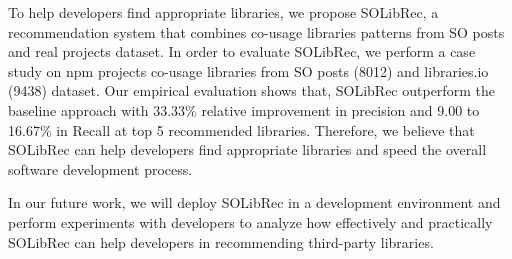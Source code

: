 \documentclass[paper]{ieice}
\newcommand{\RqTwo}{\textbf{RQ$_2$: Does SOLibRec accurately recommend third-party libraries?}}
\newcommand{\RqThree}{\textbf{RQ$_3$: Why does SOLibRec outperform CrossRec?}}
\begin{document}
To help developers find appropriate libraries, we propose SOLibRec, a recommendation system that combines co-usage libraries patterns from SO posts and real projects dataset. In order to evaluate SOLibRec, we perform a case study on npm projects co-usage libraries from SO posts (8012) and libraries.io (9438) dataset. Our empirical evaluation shows that, SOLibRec outperform the baseline approach with 33.33\% relative improvement in precision and 9.00 to 16.67\% in Recall at top 5 recommended libraries. Therefore, we believe that SOLibRec can help developers find appropriate libraries and speed the overall software development process.

In our future work, we will deploy SOLibRec in a development environment and perform experiments with developers to analyze how effectively and practically SOLibRec can help developers in recommending third-party libraries.

    
    
 









\balance
\end{document}
